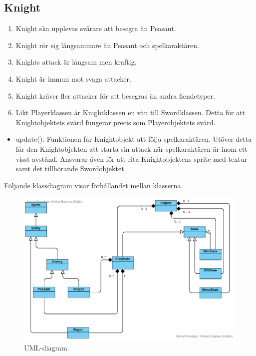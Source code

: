 \documentclass{TDP005mall}
\begin{document}
\subsection{Knight}
\begin{enumerate}
\item Knight ska upplevas svårare att besegra än Peasant. 
\item Knight rör sig långsammare än Peasant och spelkaraktären. 
\item Knights attack är långsam men kraftig.
\item Knight är immun mot svaga attacker. 
\item Knight kräver fler attacker för att besegras än andra fiendetyper.
\item Likt Playerklassen är Knightklassen en vän till Swordklassen. Detta för att Knightobjektets svärd fungerar precis som Playerobjektets svärd.
\end{enumerate}
\begin{itemize}
\item update(). Funktionen får Knightobjekt att följa spelkaraktären. Utöver detta får den Knightobjekten att starta sin attack när spelkaraktären är inom ett visst avstånd. Ansvarar även för att rita Knightobjektens sprite med textur samt det tillhörande Swordobjektet.
\end{itemize}

\newpage

Följande klassdiagram visar förhållandet mellan klasserna.
\begin{figure}[h!]
  \includegraphics[width=\linewidth]{diagram.png}
  \caption{UML-diagram.}
\end{figure}
\end{document}
